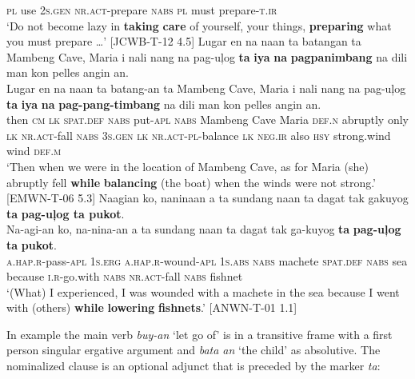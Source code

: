 \textsc{pl}  use  2\textsc{s.gen}  \textsc{nr.act}-prepare  \textsc{nabs}  \textsc{pl}  must  prepare-\textsc{t.ir} \\
\glt `Do not become lazy in \textbf{taking} \textbf{care} of yourself, your things, \textbf{preparing} what you must prepare …’ [JCWB-T-12 4.5]
\z
\ea
Lugar  en  na  naan  ta  batangan  ta  Mambeng Cave,  Maria  i nali  nang  na  pag-uļog  \textbf{ta}  \textbf{iya}  \textbf{na}  \textbf{pagpanimbang} na  dili  man  kon  pelles  angin  an. \smallskip\\
\gll Lugar  en  na  naan  ta  batang-an  ta  Mambeng Cave,  Maria  i nali  nang  na  pag-uļog  \textbf{ta}  \textbf{iya}  \textbf{na}  \textbf{pag-pang-timbang} na  dili  man  kon  pelles  angin  an. \\
then  \textsc{cm}  \textsc{lk}  \textsc{spat.def}  \textsc{nabs}  put-\textsc{apl}  \textsc{nabs}  Mambeng Cave  Maria  \textsc{def.n}
abruptly  only  \textsc{lk}  \textsc{nr.act}-fall  \textsc{nabs}  3\textsc{s.gen}  \textsc{lk}  \textsc{nr.act}-\textsc{pl}-balance
\textsc{lk}  \textsc{neg.ir}  also  \textsc{hsy}  strong.wind  wind  \textsc{def.m} \\
\glt `Then when we were in the location of Mambeng Cave, as for Maria (she) abruptly fell \textbf{while} \textbf{balancing} (the boat) when the winds were not strong.’ [EMWN-T-06 5.3]
\z
\ea
Naagian  ko,  naninaan  a  ta  sundang naan  ta  dagat  tak  gakuyog  \textbf{ta}  \textbf{pag-uļog  ta  pukot}. \smallskip\\
\gll Na-agi-an  ko,  na-nina-an  a  ta  sundang naan  ta  dagat  tak  ga-kuyog  \textbf{ta}  \textbf{pag-uļog}  \textbf{ta}  \textbf{pukot}. \\
\textsc{a.hap.r}-pass-\textsc{apl}  1\textsc{s.erg}  \textsc{a.hap.r}-wound-\textsc{apl}  1\textsc{s.abs}  \textsc{nabs}  machete
\textsc{spat.def}  \textsc{nabs}  sea  because  \textsc{i.r}-go.with  \textsc{nabs}  \textsc{nr.act}-fall  \textsc{nabs}  fishnet \\
\glt `(What) I experienced, I was wounded with a machete in the sea because I went with (others) \textbf{while} \textbf{lowering} \textbf{fishnets}.’ [ANWN-T-01 1.1]
\z

In example  the main verb \textit{buy-an} ‘let go of’ is in a transitive frame with a first person singular ergative argument and \textit{bata an} ‘the child’ as absolutive. The nominalized clause is an optional adjunct that is preceded by the marker \textit{ta}:

